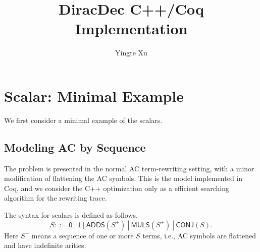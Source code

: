 \documentclass{article}
\title{\textbf{DiracDec C++/Coq Implementation\cite{ExampleCitation}}}
\author{Yingte Xu}
\begin{document}
\maketitle

\section{Scalar: Minimal Example}

We first consider a minimal example of the scalars.

\subsection{Modeling AC by Sequence}
The problem is presented in the normal AC term-rewriting setting, with a minor modification of flattening the AC symbols. This is the model implemented in Coq, and we consider the 
C++ optimization only as a efficient searching algorithm for the rewriting trace.



\newcommand{\reduce}{\triangleright}

\newcommand{\Sort}{\mathsf{Sort}}
\newcommand{\WF}{\mathcal{WF}}

\newcommand{\Type}{\mathsf{Type}}
\newcommand{\BaseS}{\mathsf{Base}}

\newcommand{\SType}{\mathcal{S}}
\newcommand{\KType}{\mathcal{K}}
\newcommand{\BType}{\mathcal{B}}
\newcommand{\OType}{\mathcal{O}}

\newcommand{\ZEROK}{\mathbf{0}_\mathcal{K}}
\newcommand{\ZEROB}{\mathbf{0}_\mathcal{B}}
\newcommand{\ZEROO}{\mathbf{0}_\mathcal{O}}

\newcommand{\PAIR}{\mathsf{PAIR}}

\newcommand{\ZERO}{\mathsf{0}}
\newcommand{\ONE}{\mathsf{1}}
\newcommand{\ADDS}{\mathsf{ADDS}}
\newcommand{\ADD}{\mathsf{ADD}}
\newcommand{\MULS}{\mathsf{MULS}}
\newcommand{\MUL}{\mathsf{MUL}}
\newcommand{\CONJ}{\mathsf{CONJ}}
\newcommand{\CJG}{\mathsf{CJG}}
\newcommand{\ADJ}{\mathsf{ADJ}}
\newcommand{\DELTA}{\mathsf{DELTA}}
\newcommand{\DOT}{\mathsf{DOT}}
\newcommand{\SCR}{\mathsf{SCR}}
\newcommand{\TSR}{\mathsf{TSR}}
\newcommand{\KET}{\mathsf{KET}}
\newcommand{\BRA}{\mathsf{BRA}}
\newcommand{\ONEO}{\mathbf{1}_\mathcal{O}}


\begin{definition}
    The syntax for scalars is defined as follows.
    \[ 
    S ::= \ZERO\ |\ \ONE\ |\ \ADDS ( S^+ )\ |\ \MULS ( S^+ )\ |\ \CONJ(S).
    \]
    Here $S^+$ means a sequence of one or more $S$ terms, i.e., AC symbols are flattened and have indefinite arities.
\end{definition}
\end{document}
